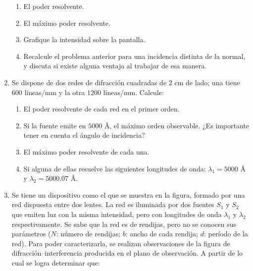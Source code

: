 \documentclass[11pt,spanish]{article}
\begin{document}
\begin{enumerate}
\begin{enumerate}
        \item El poder resolvente.

        \item El máximo poder resolvente.

        \item Grafique la intensidad sobre la pantalla.

        \item Recalcule el problema anterior para una incidencia distinta de la
        normal, y discuta si existe alguna ventaja al trabajar de esa manera.
    \end{enumerate}

    
    \item Se dispone de dos redes de difracción cuadradas de $2$ cm de lado; una
    tiene $600$ líneas/mm y la otra $1200$ líneas/mm. Calcule:

    \begin{enumerate}
        \item El poder resolvente de cada red en el primer orden.

        \item Si la fuente emite en $5000$ Å, el máximo orden observable. ¿Es 
        importante tener en cuenta el ángulo de incidencia?
        
        \item El máximo poder resolvente de cada una.
        
        \item Si alguna de ellas resuelve las siguientes longitudes de onda: 
        $\lambda_{1}=5000$ Å y $\lambda_{2}=5000.07$ Å.
        
    \end{enumerate}


    \item Se tiene un dispositivo como el que se muestra en la figura, formado
    por una red dispuesta entre dos lentes. La red es iluminada por dos
    fuentes $S_{1}$ y $S_{2}$ que emiten luz con la misma intensidad,
    pero con longitudes de onda $\lambda_{1}$ y $\lambda_{2}$ respectivamente.
    Se sabe que la red es de rendijas, pero no se conocen sus parámetros
    ($N$: número de rendijas; $b$: ancho de cada rendija; $d$: período
    de la red). Para poder caracterizarla, se realizan observaciones de
    la figura de difracción--interferencia producida en el plano de observación.
    A partir de lo cual se logra determinar que:


\end{enumerate}
\end{document}
